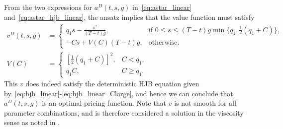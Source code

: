 \documentclass[main.tex]{subfiles}
\begin{document}
From the two expressions for $a^D(t,s,g)$ in~\eqref{eq:astar_linear}
and~\eqref{eq:astar_hjb_linear}, the ansatz implies that the value
function must satisfy
\begin{align}\label{eq:v_func_linear_det}
  v^D(t,s,g)
  &=\begin{cases}
    q_1s-\frac{s^2}{(T-t)g},
    &\text{if } 0\leq s\leq
    (T-t)g\min\{q_1,\frac{1}{2}(q_1 +C)\},\\
    -Cs + V(C)(T-t)g,
    &\text{otherwise.}
  \end{cases}\\
  V(C)
  &= \begin{cases}
    {\left[\frac{1}{2}(q_1+C)  \right]}^2,&C<
    q_1,\\
    q_1C,&C\geq q_1.
  \end{cases}
\end{align}
This $v$ does indeed satisfy the deterministic HJB equation given
by~\eqref{eq:hjb_linear}-\eqref{eq:hjb_linear_Clarge}, and hence we
can conclude that $a^D(t,s,g)$ is an optimal pricing function. Note that $v$ is
not smooth for all parameter combinations, and is therefore considered
a solution in the viscosity sense as noted in .
\end{document}
